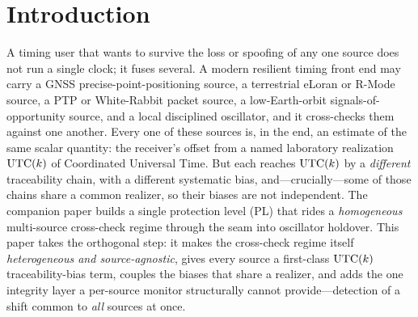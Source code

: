 \section{Introduction}
\label{sec:intro}

A timing user that wants to survive the loss or spoofing of any one source does not
run a single clock; it fuses several. A modern resilient timing front end may carry
a GNSS precise-point-positioning source, a terrestrial eLoran or R-Mode source, a
PTP or White-Rabbit packet source, a low-Earth-orbit signals-of-opportunity source,
and a local disciplined oscillator, and it cross-checks them against one another.
Every one of these sources is, in the end, an estimate of the same scalar quantity:
the receiver's offset from a named laboratory realization $\mathrm{UTC}(k){}$ of Coordinated
Universal Time. But each reaches $\mathrm{UTC}(k){}$ by a \emph{different} traceability chain,
with a different systematic bias, and---crucially---some of those chains share a
common realizer, so their biases are not independent. The companion paper
\citep{baweja2026cti} builds a single protection level (PL) that rides a
\emph{homogeneous} multi-source cross-check regime through the seam into oscillator
holdover. This paper takes the orthogonal step: it makes the cross-check regime
itself \emph{heterogeneous and source-agnostic}, gives every source a first-class
$\mathrm{UTC}(k){}$ traceability-bias term, couples the biases that share a realizer, and adds
the one integrity layer a per-source monitor structurally cannot provide---detection
of a shift common to \emph{all} sources at once.

